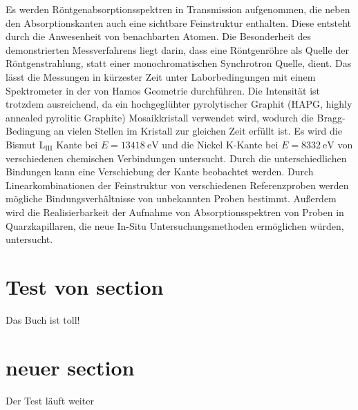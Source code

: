 Es werden Röntgenabsorptionsspektren in Transmission aufgenommen, die neben den Absorptionskanten auch eine sichtbare Feinstruktur enthalten. Diese entsteht durch die Anwesenheit von benachbarten Atomen. Die Besonderheit des demonstrierten Messverfahrens liegt darin, dass eine Röntgenröhre als Quelle der Röntgenstrahlung, statt einer monochromatischen Synchrotron Quelle, dient. Das lässt die Messungen in kürzester Zeit unter Laborbedingungen mit einem Spektrometer in der von Hamos Geometrie durchführen. Die Intensität ist trotzdem ausreichend, da ein hochgeglühter pyrolytischer Graphit (HAPG,  highly annealed pyrolitic Graphite) Mosaikkristall verwendet wird, wodurch die Bragg-Bedingung an vielen Stellen im Kristall zur gleichen Zeit erfüllt ist. Es wird die Bismut L$_\mathrm{III}$ Kante bei $E=\SI{13418}{\eV}$ und die Nickel K-Kante bei $E=\SI{8332}{\eV}$ von verschiedenen chemischen Verbindungen untersucht. Durch die unterschiedlichen Bindungen kann eine Verschiebung der Kante beobachtet werden. Durch Linearkombinationen der Feinstruktur von verschiedenen Referenzproben werden mögliche Bindungsverhältnisse von unbekannten Proben bestimmt. Außerdem wird die Realisierbarkeit der Aufnahme von Absorptionsspektren von Proben in Quarzkapillaren, die neue In-Situ Untersuchungsmethoden ermöglichen würden, untersucht.
\section{Test von section}
Das Buch \cite{cartier_micron_2014} ist toll!
\newpage
\section{neuer section}
Der Test läuft weiter \cite{tripathi_dichroic_2011}